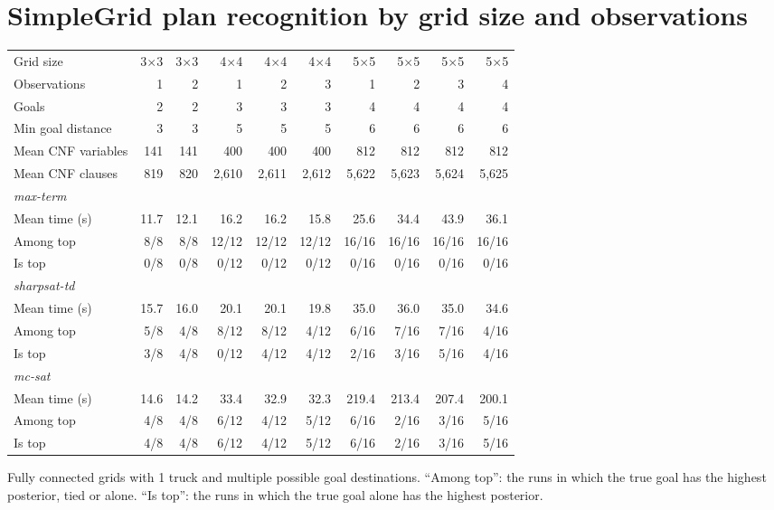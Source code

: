 \documentclass[10pt]{article}
\begin{document}
\pagestyle{empty}
\section*{SimpleGrid plan recognition by grid size and observations}
\newsavebox{\tbl}
\begin{lrbox}{\tbl}\small
\begin{tabular}{lrrrrrrrrr}
\toprule
Grid size & 3$\times$3 & 3$\times$3 & 4$\times$4 & 4$\times$4 & 4$\times$4 & 5$\times$5 & 5$\times$5 & 5$\times$5 & 5$\times$5 \\
Observations & 1 & 2 & 1 & 2 & 3 & 1 & 2 & 3 & 4 \\
\midrule
Goals & 2 & 2 & 3 & 3 & 3 & 4 & 4 & 4 & 4 \\
Min goal distance & 3 & 3 & 5 & 5 & 5 & 6 & 6 & 6 & 6 \\
Mean CNF variables & 141 & 141 & 400 & 400 & 400 & 812 & 812 & 812 & 812 \\
Mean CNF clauses & 819 & 820 & 2,610 & 2,611 & 2,612 & 5,622 & 5,623 & 5,624 & 5,625 \\
\midrule
\multicolumn{10}{l}{\textit{max-term}} \\
\quad Mean time (s) & 11.7 & 12.1 & 16.2 & 16.2 & 15.8 & 25.6 & 34.4 & 43.9 & 36.1 \\
\quad Among top & 8/8 & 8/8 & 12/12 & 12/12 & 12/12 & 16/16 & 16/16 & 16/16 & 16/16 \\
\quad Is top & 0/8 & 0/8 & 0/12 & 0/12 & 0/12 & 0/16 & 0/16 & 0/16 & 0/16 \\
\midrule
\multicolumn{10}{l}{\textit{sharpsat-td}} \\
\quad Mean time (s) & 15.7 & 16.0 & 20.1 & 20.1 & 19.8 & 35.0 & 36.0 & 35.0 & 34.6 \\
\quad Among top & 5/8 & 4/8 & 8/12 & 8/12 & 4/12 & 6/16 & 7/16 & 7/16 & 4/16 \\
\quad Is top & 3/8 & 4/8 & 0/12 & 4/12 & 4/12 & 2/16 & 3/16 & 5/16 & 4/16 \\
\midrule
\multicolumn{10}{l}{\textit{mc-sat}} \\
\quad Mean time (s) & 14.6 & 14.2 & 33.4 & 32.9 & 32.3 & 219.4 & 213.4 & 207.4 & 200.1 \\
\quad Among top & 4/8 & 4/8 & 6/12 & 4/12 & 5/12 & 6/16 & 2/16 & 3/16 & 5/16 \\
\quad Is top & 4/8 & 4/8 & 6/12 & 4/12 & 5/12 & 6/16 & 2/16 & 3/16 & 5/16 \\
\bottomrule
\end{tabular}
\end{lrbox}
\noindent{}
\par\bigskip\noindent
\begin{minipage}{\textwidth}\small Fully connected grids with 1 truck and multiple possible goal destinations. ``Among top'': the runs in which the true goal has the highest posterior, tied or alone. ``Is top'': the runs in which the true goal alone has the highest posterior.\end{minipage}
\end{document}
